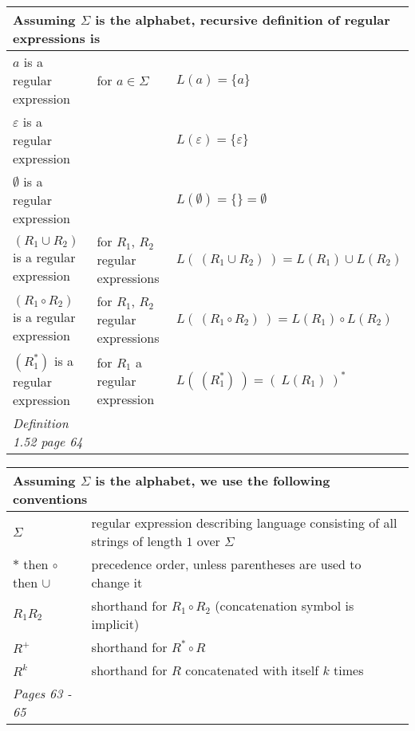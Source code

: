     
    
    \begin{center}
    \begin{tabular}{|lll|}
    \hline
    \multicolumn{3}{|l|}{Assuming $\Sigma$ is the alphabet, recursive definition of regular expressions is}\\
    \hline
    $a$ is a regular expression  & for $a \in \Sigma$ & $L(a) = \{a\}$ \\
    $\varepsilon$ is a regular expression   & & $L(\varepsilon) = \{ \varepsilon \}$ \\
    $\emptyset$ is a regular expression  & & $L(\emptyset) = \{\} =  \emptyset$ \\
    $(R_1 \cup R_2)$ is a regular expression & for  $R_1$, $R_2$ regular expressions & 
    $L( ~(R_1\cup R_2) ~)  =
    L(R_1) \cup L(R_2)$ \\
    $(R_1 \circ R_2)$ is a regular expression & for  $R_1$, $R_2$ regular expressions & 
    $L( ~(R_1\circ R_2) ~)  =
    L(R_1) \circ L(R_2)$ \\
    $(R_1^*)$ is a regular expression & for  $R_1$ a regular expression & $L( ~(R_1^*) ~)  = (~L(R_1) ~)^*$ \\
    \hline
    {\it Definition 1.52 page 64} & & \\
    \hline
    \end{tabular}
    \end{center}
    
    
    \begin{center}
    \begin{tabular}{|ll|}
    \hline
    \multicolumn{2}{|l|}{Assuming $\Sigma$ is the alphabet, we use the following conventions}\\
    \hline
    $\Sigma$   & regular  expression describing language consisting of  all strings  of length  $1$ over $\Sigma$\\
    $*$ then $\circ$ then $\cup$   & precedence order, unless parentheses are used to change it\\
    $R_1R_2$ & shorthand  for  $R_1  \circ R_2$ (concatenation symbol is implicit) \\
    $R^+$ & shorthand for $R^* \circ R$ \\
    $R^k$ & shorthand for $R$ concatenated with itself $k$ times\\
    \hline
    {\it Pages 63 - 65 }& \\
    \hline
    \end{tabular}
    \end{center}
    
